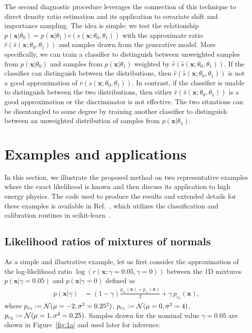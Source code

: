 \documentclass[12pt]{article}
\numberwithin{equation}{section}
\theoremstyle{plain}
\begin{document}
The second diagnostic procedure leverages the connection of this technique to direct density ratio estimation and its application to covariate shift and importance sampling. The idea is simple: we test the relationship $p(\mathbf{x}|\theta_0) = p(\mathbf{x}|\theta_1) {r}({s}(\mathbf{x}; \theta_0, \theta_1))$ with the approximate ratio $\hat{r}(\hat{s}(\mathbf{x}; \theta_0, \theta_1))$ and samples drawn from the generative model. More specifically, we can train a classifier to distinguish between unweighted samples from $p(\mathbf{x}|\theta_0)$ and samples from $p(\mathbf{x}|\theta_1)$ weighted by $\hat{r}(\hat{s}(\mathbf{x}; \theta_0, \theta_1))$.
If the classifier can distinguish between the distributions, then $\hat{r}(\hat{s}(\mathbf{x}; \theta_0, \theta_1))$ is not a good approximation of ${r}({s}(\mathbf{x}; \theta_0, \theta_1))$. In contrast, if the classifier is unable to distinguish between the two distributions, then either $\hat{r}(\hat{s}(\mathbf{x}; \theta_0, \theta_1))$ is a good approximation or the discriminator is not effective. The two situations can be disentangled to some degree by training another classifier to distinguish between an unweighted distribution of samples from $p(\mathbf{x}|\theta_1)$.


\section{Examples and applications}
\label{sec:examples}

In this section, we illustrate the proposed method on two representative
examples where the exact likelihood is known and then discuss its application to high energy physics. The code used to produce the results and extended details for these examples is available in Ref.~\citep{carl}, which utilizes the classification and calibration routines in scikit-learn~\citep{scikit-learn}. %

\subsection{Likelihood ratios of mixtures of normals}

As a simple and illustrative example, let us first consider the approximation of
the log-likelihood ratio $\log \left( r(\mathbf{x};\gamma=0.05,\gamma=0) \right)$ between the 1D mixtures
$p(\mathbf{x}|\gamma=0.05)$ and $p(\mathbf{x}|\gamma=0)$ defined as
\begin{align}
p(\mathbf{x}|\gamma) &= (1-\gamma)\frac{p_{c_0}(\mathbf{x}) +  p_{c_1}(\mathbf{x})}{2}   + \gamma \, p_{c_2}(\mathbf{x}),
\end{align}
where $p_{c_0} := {\cal N}(\mu=-2, \sigma^2=0.25^2)$, $p_{c_1} := {\cal N}(\mu=0, \sigma^2=4)$,
$p_{c_2} := {\cal N}(\mu=1, \sigma^2=0.25)$. Samples drawn for the nominal value $\gamma=0.05$ are shown in
Figure~\ref{fig:1a} and used later for inference.
\end{document}
